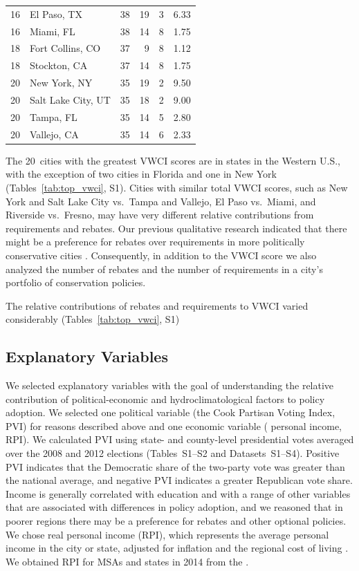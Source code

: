 \documentclass[draft,linenumbers]{agujournal}\usepackage{knitr}
\begin{document}
\begin{table}[tbp]
\begin{tabular}{rlrrrr}
   16 & El Paso, TX &  38 &  19 &   3 & 6.33 \\ 
   16 & Miami, FL &  38 &  14 &   8 & 1.75 \\ 
   18 & Fort Collins, CO &  37 &   9 &   8 & 1.12 \\ 
   18 & Stockton, CA &  37 &  14 &   8 & 1.75 \\ 
   20 & New York, NY &  35 &  19 &   2 & 9.50 \\ 
   20 & Salt Lake City, UT &  35 &  18 &   2 & 9.00 \\ 
   20 & Tampa, FL &  35 &  14 &   5 & 2.80 \\ 
   20 & Vallejo, CA &  35 &  14 &   6 & 2.33 \\ 
   \hline
\end{tabular}
\end{table}

The 20~cities with the greatest VWCI scores are in states in the
Western U.S., with the exception of two cities in Florida and one in New York
(Tables~\ref{tab:top_vwci}, S1). Cities with similar total VWCI scores, such as
New York and Salt Lake City vs.\ Tampa and Vallejo, El Paso vs.\ Miami, and
Riverside vs.\ Fresno, may have very different relative contributions from
requirements and rebates.
Our previous qualitative research
indicated that there might be a preference for rebates over requirements in more
politically conservative cities \citep{hess:drought:2016,brown:politics:2016}.
Consequently, in addition to the VWCI score we also analyzed the number of
rebates and the number of requirements in a city's portfolio of conservation
policies.

The relative contributions of rebates and requirements to VWCI varied
considerably (Tables~\ref{tab:top_vwci}, S1)

\subsection{Explanatory Variables}
We selected explanatory variables with the goal of understanding the
relative contribution of political-economic and hydroclimatological factors
to policy adoption.
We selected one political variable (the Cook Partisan Voting Index, PVI) for reasons
described above and one economic variable ( personal income, RPI).
We calculated PVI using state- and county-level presidential votes averaged over the
2008 and 2012 elections \citep{cook:pvi:2013,cq:elections:2016}
(Tables~S1--S2 and Datasets~S1--S4).
Positive PVI indicates that the Democratic share of the two-party vote was greater
than the national average, and negative PVI indicates a greater Republican vote share.
Income is generally correlated with education and with a range of other variables that
are associated with differences in policy adoption, and we reasoned that in poorer
regions there may be a preference for rebates and other optional policies.
We chose real personal income (RPI), which represents the average personal income in the city
or state, adjusted for inflation and the regional cost of living
\citep{bea:rpp.methodology:2016}.
We obtained RPI for MSAs and states in 2014 from the
\citet{bea:rpi:2016}.
\end{document}
